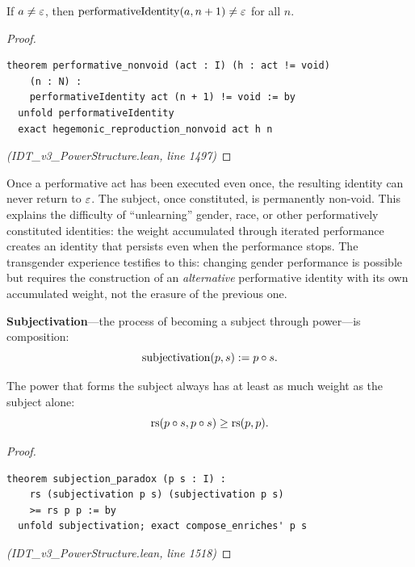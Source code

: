 \begin{theorem}
\label{thm:performative-nonvoid}
If $a \neq \varepsilon$, then $\mathrm{performativeIdentity}(a, n+1) \neq \varepsilon$ for all $n$.
\end{theorem}

\begin{proof}
\begin{lstlisting}
theorem performative_nonvoid (act : I) (h : act != void)
    (n : N) :
    performativeIdentity act (n + 1) != void := by
  unfold performativeIdentity
  exact hegemonic_reproduction_nonvoid act h n
\end{lstlisting}
\textit{(IDT\_v3\_PowerStructure.lean, line 1497)}
\end{proof}

\begin{interpretation}
Once a performative act has been executed even once, the resulting identity
can never return to $\varepsilon$. The subject, once constituted, is permanently
non-void. This explains the difficulty of ``unlearning'' gender, race, or
other performatively constituted identities: the weight accumulated through
iterated performance creates an identity that persists even when the
performance stops. The transgender experience testifies to this: changing
gender performance is possible but requires the construction of an
\emph{alternative} performative identity with its own accumulated weight,
not the erasure of the previous one.
\end{interpretation}

\begin{definition}[Subjectivation]
\label{def:subjectivation}
\textbf{Subjectivation}---the process of becoming a subject through power---is
composition:
\[
  \mathrm{subjectivation}(p, s) := p \circ s.
\]
\end{definition}

\begin{theorem}
\label{thm:subjection-paradox}
The power that forms the subject always has at least as much weight as
the subject alone:
\[
  \mathrm{rs}(p \circ s, p \circ s) \geq \mathrm{rs}(p, p).
\]
\end{theorem}

\begin{proof}
\begin{lstlisting}
theorem subjection_paradox (p s : I) :
    rs (subjectivation p s) (subjectivation p s)
    >= rs p p := by
  unfold subjectivation; exact compose_enriches' p s
\end{lstlisting}
\textit{(IDT\_v3\_PowerStructure.lean, line 1518)}
\end{proof}

